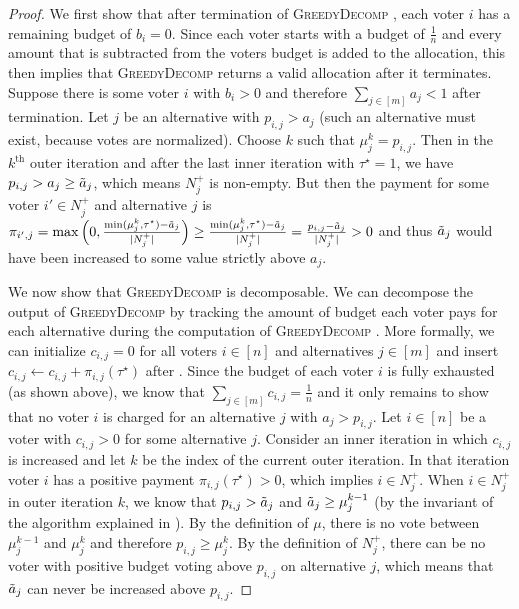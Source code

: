 \documentclass[11pt]{article}
\newcommand{\GrdDec}{\textsc{GreedyDecomp} }
\begin{document}
\begin{proof}
    We first show that after termination of \GrdDec, each voter $i$ has a remaining budget of $b_i = 0$. Since each voter starts with a budget of $\frac{1}{n}$ and every amount that is subtracted from the voters budget is added to the allocation, this then implies that \GrdDec returns a valid allocation after it terminates.
    Suppose there is some voter $i$ with $b_i > 0$ and therefore $\sum_{j \in [m]} a_j < 1$ after termination. Let $j$ be an alternative with $p_{i,j} > a_j$ (such an alternative must exist, because votes are normalized). Choose $k$ such that $\mu_j^k = p_{i,j}$. Then in the $k^\text{th}$ outer iteration and after the last inner iteration with $\tau^\star = 1$, we have $p_{i,j} > a_j \ge \Tilde{a}_j$, which means $N_j^+$ is non-empty. But then the payment for some voter $i' \in N^+_j$ and alternative $j$ is $\pi_{i',j} = \max \Big(0, \frac{\min(\mu^k_j, \tau^\star) - \Tilde{a}_j}{|N_j^+|}\Big) \ge \frac{\min(\mu^k_j, \tau^\star) - \Tilde{a}_j}{|N_j^+|} = \frac{p_{i,j} - \Tilde{a}_j}{{|N_j^+|}} > 0$ and thus $\Tilde{a}_j$ would have been increased to some value strictly above $a_j$.

    
    We now show that \GrdDec is decomposable. We can decompose the output of \GrdDec by tracking the amount of budget each voter pays for each alternative during the computation of \GrdDec. More formally, we can initialize $c_{i,j} = 0$ for all voters $i \in [n]$ and alternatives $j \in [m]$ and insert $c_{i,j} \gets c_{i,j} + \pi_{i,j}(\tau^\star)$ after . Since the budget of each voter $i$ is fully exhausted (as shown above), we know that $\sum_{j \in [m]} c_{i,j} = \frac{1}{n}$ and it only remains to show that no voter $i$ is charged for an alternative $j$ with $a_j > p_{i,j}$. 
    Let $i \in [n]$ be a voter with $c_{i,j} > 0$ for some alternative $j$. Consider an inner iteration in which $c_{i,j}$ is increased and let $k$ be the index of the current outer iteration. In that iteration voter $i$ has a positive payment $\pi_{i,j}(\tau^\star) > 0$, which implies $i \in N^+_j$. 
    When $i \in N^+_j$ in outer iteration $k$, we know that $p_{i,j} > \Tilde{a}_j$ and $\Tilde{a}_j \ge \mu^{k-1}_j$ (by the invariant of the algorithm explained in ). By the definition of $\mu$, there is no vote between $\mu^{k-1}_j$ and $\mu^k_j$ and therefore $p_{i,j} \ge \mu^k_j$.
    By the definition of $N^+_j$, there can be no voter with positive budget voting above $p_{i,j}$ on alternative $j$, which means that $\Tilde{a}_j$ can never be increased above $p_{i,j}$.
    


\end{proof}
\end{document}
